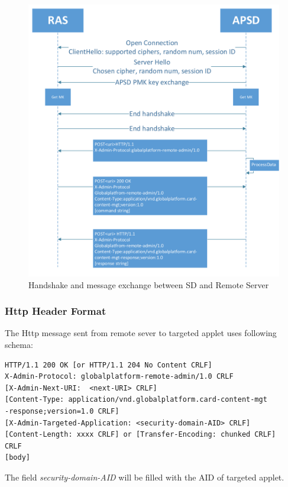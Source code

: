 \begin{figure}[!htbp]
	\centering
	\includegraphics[width=1\textwidth]{communication-flow}
		\caption{Handshake and message exchange between SD and Remote Server}
	\label{fig:communication-flow}
\end{figure}

\subsubsection{Http Header Format} \label{secHTTPHeader}
The Http message sent from remote sever to targeted applet uses following schema\cite{gp}:
\begin{Verbatim}[fontsize=\relsize{-1}, frame=lines,framesep=4mm, label=\fbox{\small\emph{Http Request Schema}}]
HTTP/1.1 200 OK [or HTTP/1.1 204 No Content CRLF]
X-Admin-Protocol: globalplatform-remote-admin/1.0 CRLF
[X-Admin-Next-URI:  <next-URI> CRLF]
[Content-Type: application/vnd.globalplatform.card-content-mgt
-response;version=1.0 CRLF]
[X-Admin-Targeted-Application: <security-domain-AID> CRLF]
[Content-Length: xxxx CRLF] or [Transfer-Encoding: chunked CRLF]
CRLF
[body]
\end{Verbatim}
The field \emph{security-domain-AID} will be filled with the AID of targeted applet.


